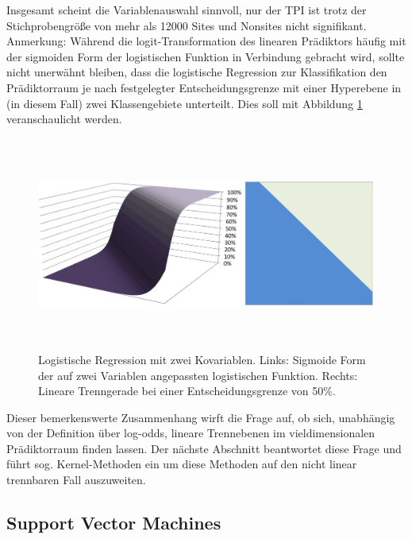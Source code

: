 Insgesamt scheint die Variablenauswahl sinnvoll, nur der TPI ist trotz der Stichprobengröße von mehr als 12000 Sites und Nonsites nicht signifikant. 
Anmerkung: Während die logit-Transformation des linearen Prädiktors häufig mit der sigmoiden Form der logistischen Funktion in Verbindung gebracht wird, sollte nicht unerwähnt bleiben, dass die logistische Regression zur Klassifikation den Prädiktorraum je nach festgelegter Entscheidungsgrenze mit einer Hyperebene in (in diesem Fall) zwei Klassengebiete unterteilt. \cite{trenngerade} Dies soll mit Abbildung \ref{trenngerade} veranschaulicht werden. 

\begin{figure}[H]
    \centering
    \includegraphics[width = 13cm, height = 7cm]{Figures/trenngerade.png}
    \caption{Logistische Regression mit zwei Kovariablen. Links: Sigmoide Form der auf zwei Variablen angepassten logistischen Funktion. Rechts: Lineare Trenngerade bei einer Entscheidungsgrenze von 50\%. \cite{trenngerade}}
    \label{trenngerade}
\end{figure}

Dieser bemerkenswerte Zusammenhang wirft die Frage auf, ob sich, unabhängig von der Definition über log-odds, lineare Trennebenen im vieldimensionalen Prädiktorraum finden lassen. Der nächste Abschnitt beantwortet diese Frage und führt sog. Kernel-Methoden ein um diese Methoden auf den nicht linear trennbaren Fall auszuweiten.

\subsection{Support Vector Machines}
